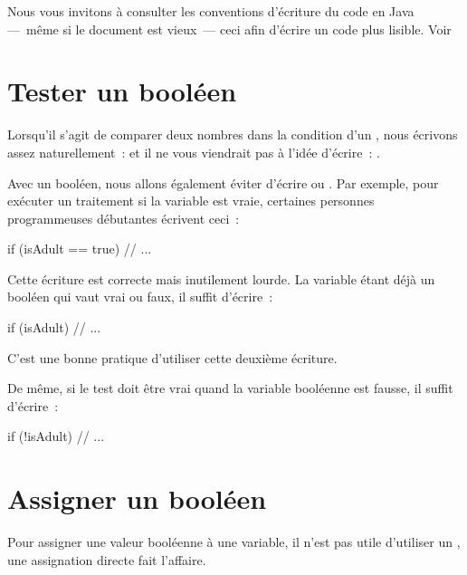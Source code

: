 	Nous vous invitons à consulter les conventions d'écriture du code en Java
	—~même si le document est vieux~— ceci afin d'écrire un code plus lisible.
	Voir \cite{java-codeconv}

\section{Tester un booléen}

	Lorsqu’il s’agit de comparer deux nombres dans la condition d’un ,
	nous écrivons assez naturellement~:  et il ne vous
	viendrait pas à l’idée d’écrire~: .
	
	\bigskip
		
	Avec un booléen, nous allons également éviter d'écrire  ou
	.  Par exemple, pour exécuter un traitement si la variable
	 est vraie, certaines personnes programmeuses débutantes écrivent
	ceci~:
	
	\begin{java}
		if (isAdult == true){
			// ...
		}
	\end{java}

	Cette écriture est correcte mais inutilement lourde.  La variable étant déjà
	un booléen qui vaut vrai ou faux, il suffit d’écrire~:

	\begin{java}
if (isAdult){
	// ...
}
	\end{java}

	C'est une bonne pratique d'utiliser cette deuxième écriture. 
	
	De même, si le test doit être vrai quand la variable booléenne est fausse,
	il suffit d’écrire~: 
	
	\begin{java}
if (!isAdult){
	// ...
}
	\end{java}
	

\section{Assigner un booléen}\label{B-ass-bool}

	Pour assigner une valeur booléenne à une variable, il n'est pas utile
	d'utiliser un , une assignation directe fait l'affaire. 

